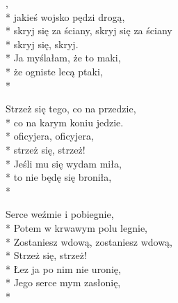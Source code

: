 
\begin{lyrics}[longestline={niech mnie zabiera, zabiera, zabiera.}]

,\\*
jakieś wojsko pędzi drogą,\\*
skryj się za ściany, skryj się za ściany\\*
skryj się, skryj.\\*
\vin Ja myślałam, że to maki,\\*
\vin że ogniste lecą ptaki,\\*

Strzeż się tego, co na przedzie,\\*
co na karym koniu jedzie.\\*
oficyjera, oficyjera,\\*
strzeż się, strzeż!\\*
\vin Jeśli mu się wydam miła,\\*
\vin to nie będę się broniła,\\*

Serce weźmie i pobiegnie,\\*
Potem w krwawym polu legnie,\\*
Zostaniesz wdową, zostaniesz wdową,\\*
Strzeż się, strzeż!\\*
\vin Łez ja po nim nie uronię,\\*
\vin Jego serce mym zasłonię,\\*
\end{lyrics}




